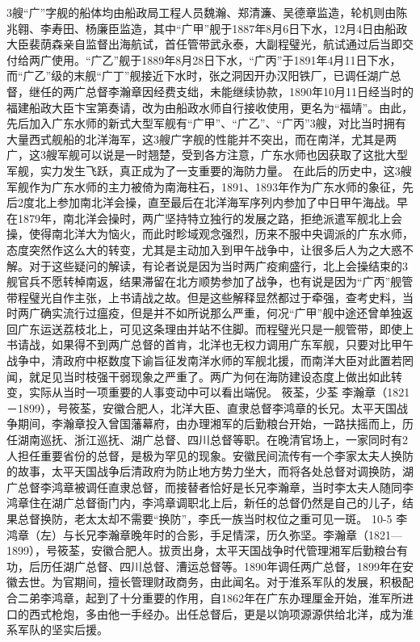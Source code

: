 \documentclass[12pt,UTF8]{ctexbook}
\begin{document}
3艘“广”字舰的船体均由船政局工程人员魏瀚、郑清濂、吴德章监造，轮机则由陈兆翱、李寿田、杨廉臣监造，其中“广甲”舰于1887年8月6日下水，12月4日由船政大臣裴荫森亲自监督出海航试，首任管带武永泰，大副程璧光，航试通过后当即交付给两广使用。“广乙”舰于1889年8月28日下水，“广丙”于1891年4月11日下水，而“广乙”级的末舰“广丁”舰接近下水时，张之洞因开办汉阳铁厂，已调任湖广总督，继任的两广总督李瀚章因经费支绌，未能继续协款，1890年10月11日经当时的福建船政大臣卞宝第奏请，改为由船政水师自行接收使用，更名为“福靖”。由此，先后加入广东水师的新式大型军舰有“广甲”、“广乙”、“广丙”3艘，对比当时拥有大量西式舰船的北洋海军，这3艘广字舰的性能并不突出，而在南洋，尤其是两广，这3艘军舰可以说是一时翘楚，受到各方注意，广东水师也因获取了这批大型军舰，实力发生飞跃，真正成为了一支重要的海防力量。
在此后的历史中，这3艘军舰作为广东水师的主力被倚为南海柱石，1891、1893年作为广东水师的象征，先后2度北上参加南北洋会操，直至最后在北洋海军序列内参加了中日甲午海战。早在1879年，南北洋会操时，两广坚持特立独行的发展之路，拒绝派遣军舰北上会操，使得南北洋大为恼火，而此时畛域观念强烈，历来不服中央调派的广东水师，态度突然作这么大的转变，尤其是主动加入到甲午战争中，让很多后人为之大惑不解。对于这些疑问的解读，有论者说是因为当时两广疫痢盛行，北上会操结束的3舰官兵不愿转棹南返，结果滞留在北方顺势参加了战争，也有说是因为“广丙”舰管带程璧光自作主张，上书请战之故。但是这些解释显然都过于牵强，查考史料，当时两广确实流行过瘟疫，但是并不如所说那么严重，何况“广甲”舰中途还曾单独返回广东运送荔枝北上，可见这条理由并站不住脚。而程璧光只是一舰管带，即使上书请战，如果得不到两广总督的首肯，北洋也无权力调用广东军舰，只要对比甲午战争中，清政府中枢数度下谕旨征发南洋水师的军舰北援，而南洋大臣对此置若罔闻，就足见当时枝强干弱现象之严重了。两广为何在海防建设态度上做出如此转变，实际从当时一项重要的人事变动中可以看出端倪。
筱荃，少荃
李瀚章（1821－1899），号筱荃，安徽合肥人，北洋大臣、直隶总督李鸿章的长兄。太平天国战争期间，李瀚章投入曾国藩幕府，由办理湘军的后勤粮台开始，一路扶摇而上，历任湖南巡抚、浙江巡抚、湖广总督、四川总督等职。在晚清官场上，一家同时有2人担任重要省份的总督，是极为罕见的现象。安徽民间流传有一个李家太夫人换防的故事，太平天国战争后清政府为防止地方势力坐大，而将各处总督对调换防，湖广总督李鸿章被调任直隶总督，而接替者恰好是长兄李瀚章，当时李太夫人随同李鸿章住在湖广总督衙门内，李鸿章调职北上后，新任的总督仍然是自己的儿子，结果总督换防，老太太却不需要“换防”，李氏一族当时权位之重可见一斑。
10-5
李鸿章（左）与长兄李瀚章晚年时的合影，手足情深，历久弥坚。李瀚章（1821—1899），号筱荃，安徽合肥人。拔贡出身，太平天国战争时代管理湘军后勤粮台有功，后历任湖广总督、四川总督、漕运总督等。1890年调任两广总督，1899年在安徽去世。为官期间，擅长管理财政商务，由此闻名。对于淮系军队的发展，积极配合二弟李鸿章，起到了十分重要的作用，自1862年在广东办理厘金开始，淮军所进口的西式枪炮，多由他一手经办。出任总督后，更是以饷项源源供给北洋，成为淮系军队的坚实后援。
\end{document}
